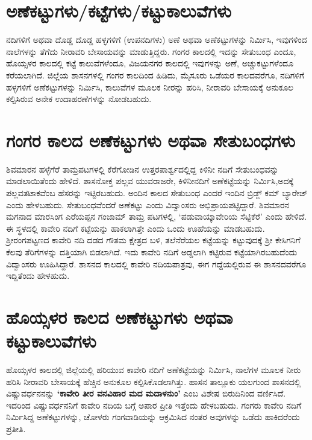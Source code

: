 \section{ಅಣೆಕಟ್ಟುಗಳು/ಕಟ್ಟೆಗಳು/ಕಟ್ಟುಕಾಲುವೆಗಳು}

ನದಿಗಳಿಗೆ ಅಥವಾ ದೊಡ್ಡ ದೊಡ್ಡ ಹಳ್ಳಗಳಿಗೆ (ಉಪನದಿಗಳು) ಅಣೆ ಅಥವಾ ಅಣೆಕಟ್ಟುಗಳನ್ನು ನಿರ್ಮಿಸಿ, ಇವುಗಳಿಂದ ನಾಲೆಗಳನ್ನು ತೆಗೆದು ನೀರಾವರಿ ಬೇಸಾಯವನ್ನು ಮಾಡುತ್ತಿದ್ದರು. ಗಂಗರ ಕಾಲದಲ್ಲಿ ಇದನ್ನು ಸೇತುಬಂಧ ಎಂದೂ, ಹೊಯ್ಸಳರ ಕಾಲದಲ್ಲಿ ಕಟ್ಟೆ ಕಾಲುವೆಗಳೆಂದೂ, ವಿಜಯನಗರ ಕಾಲದಲ್ಲಿ ಇವುಗಳನ್ನು ಅಣೆ, ಅಚ್ಚುಕಟ್ಟುಗಳೆಂದೂ ಕರೆಯಲಾಗಿದೆ. ಜಿಲ್ಲೆಯ ಶಾಸನಗಳಲ್ಲಿ ಗಂಗರ ಕಾಲದಿಂದ ಹಿಡಿದು, ಮೈಸೂರು ಒಡೆಯರ ಕಾಲದವರೆಗೂ, ನದಿಗಳಿಗೆ ಹಳ್ಳಗಳಿಗೆ ಅಣೆಕಟ್ಟು\-ಗಳನ್ನು ನಿರ್ಮಿಸಿ, ಕಾಲುವೆಗಳ ಮೂಲಕ ನೀರನ್ನು ಹರಿಸಿ, ನೀರಾವರಿ ಬೇಸಾಯಕ್ಕೆ ಅನುಕೂಲ ಕಲ್ಪಿಸಿರುವ ಅನೇಕ ಉದಾ\-ಹರಣೆಗಳನ್ನು ನೋಡಬಹುದು.


\section{ಗಂಗರ ಕಾಲದ ಅಣೆಕಟ್ಟುಗಳು ಅಥವಾ ಸೇತುಬಂಧಗಳು}

ಶಿವಮಾರನ ಹಳ್ಳೆಗೆರೆ ತಾಮ್ರಪಟಗಳಲ್ಲಿ ಕೆರೆಗೋಡಿನ ಉತ್ತರಪಾರ್ಶ್ವದಲ್ಲಿದ್ದ ಕಿಳಿನೀ ನದಿಗೆ ಸೇತುಬಂಧವನ್ನು ಮಾಡಲಾಯಿತೆಂದು ಹೇಳಿದೆ. ಶಾಸನೋಕ್ತ ಪಲ್ಲವ ಯುವರಾಜರೇ, ಕಿಳಿನೀನದಿಗೆ ಅಣೆಕಟ್ಟೆಯನ್ನು ನಿರ್ಮಿಸಿ,ಅದಕ್ಕೆ ಪಲ್ಲವತಟಾಕವೆಂಬ ಹೆಸರನ್ನು ಇಟ್ಟಿರಬಹುದು. ಅಂದಿನ ಕಾಲದ ಸೇತುಬಂಧ ಎಂದರೆ ಇಂದಿನ ಬ್ರಿಡ್ಜ್​ ಕಮ್ ಬ್ಯಾರೇಜ್​ ಎಂದು ಹೇಳಬಹುದು. ಸೇತುಬಂಧವೆಂದರೆ ಅಣೆಕಟ್ಟು ಎಂದು ವಿದ್ವಾಂಸರು ಅಭಿಪ್ರಾಯಪಟ್ಟಿದ್ದಾರೆ. ಶಿವಮಾರನ ಮಗನಾದ ಮಾರಸಿಂಗ ಎರೆಯಪ್ಪನ ಗಂಜಾಮ್ ತಾಮ್ರ ಪಟಗಳಲ್ಲಿ, ‘ಪಡುವಾಯ್ಕಾವೇರಿಯ ಸೆಟ್ಟಿಕೆರೆ’ ಎಂದು ಹೇಳಿದೆ. ಈ ಸ್ಥಳದಲ್ಲಿ ಕಾವೇರಿ ನದಿಗೆ ಕಟ್ಟೆಯನ್ನು ಹಾಕಲಾಗಿತ್ತೇ ಎಂದು ಒಂದು ಊಹೆಯನ್ನು ಮಾಡಬಹುದು. ಶ‍್ರೀರಂಗಪಟ್ಟಣದ ಕಾವೇರಿ ನದಿ ದಡದ ಗೌತಮ ಕ್ಷೇತ್ರದ ಬಳಿ, ತಲೆನೆರೆಯಲ ಕಟ್ಟೆಯನ್ನು ಕಟ್ಟುವುದಕ್ಕೆ ಶ‍್ರೀ ಕೇಸಿಗನಿಗೆ ಕೆಲವು ತೆರಿಗೆಗಳನ್ನು ದತ್ತಿಯಾಗಿ ಬಿಡಲಾಗಿದೆ. ಇದು ಕಾವೇರಿ ನದಿಗೆ ಅಡ್ಡಲಾಗಿ ಕಟ್ಟಿರುವ ಕಟ್ಟೆಯಾಗಿರಬಹುದೆಂದು ವಿದ್ವಾಂಸರು ಊಹಿಸಿದ್ದಾರೆ. ಶಾಸನದ ಕಾಲದಲ್ಲಿ ಕಾವೇರಿ ನದಿಯಪಾತ್ರವು, ಈಗ ಗದ್ದೆಯಲ್ಲಿರುವ ಈ ಶಾಸನದವರೆಗೂ ಇದ್ದಿತೆಂದು ಹೇಳಹುದು.


\section{ಹೊಯ್ಸಳರ ಕಾಲದ ಅಣೆಕಟ್ಟುಗಳು ಅಥವಾ ಕಟ್ಟುಕಾಲುವೆಗಳು}

ಹೊಯ್ಸಳರ ಕಾಲದಲ್ಲಿ ಜಿಲ್ಲೆಯಲ್ಲಿ ಹರಿಯುವ ಕಾವೇರಿ ನದಿಗೆ ಅಣೆಕಟ್ಟೆಯನ್ನು ನಿರ್ಮಿಸಿ, ನಾಲೆಗಳ ಮೂಲಕ ನೀರು ಹರಿಸಿ ನೀರಾವರಿ ಬೇಸಾಯಕ್ಕೆ ಹೆಚ್ಚಿನ ಅನುಕೂಲ ಕಲ್ಪಿಸಿಕೊಡಲಾಗಿತ್ತು. ಹಾಸನ ತಾಲ್ಲೂಕು ಯಲಗುಂದ ಶಾಸನದಲ್ಲಿ ವಿಷ್ಣುವರ್ಧನನನ್ನು \textbf{‘ಕಾವೇರಿ ತೀರ ವನವಿಹಾರ ಮದ ಮದಾಳನುಂ’} ಎಂಬ ವಿಶೇಷ ಬಿರುದಿನಿಂದ ವರ್ಣಿಸಿದೆ. ಇದರಿಂದ ವಿಷ್ಣುವರ್ಧನನಿಗೆ ಕಾವೇರಿ ನದಿಯ ಬಗ್ಗೆ ಅಪಾರ ಪ್ರೀತಿ ಇತ್ತೆಂದು ಹೇಳಬಹುದು. ಗಂಗರು ಕಾವೇರಿ ನದಿಗೆ ನಿರ್ಮಿಸಿದ್ದ ಅಣೆಕಟ್ಟುಗಳನ್ನು, ಚೋಳರು ಗಂಗವಾಡಿಯನ್ನು ಆಕ್ರಮಿಸಿದ ನಂತರ ಅವುಗಳನ್ನು ಒಡೆದು ಹಾಕಿದರೆಂದು ಪ್ರತೀತಿ.

